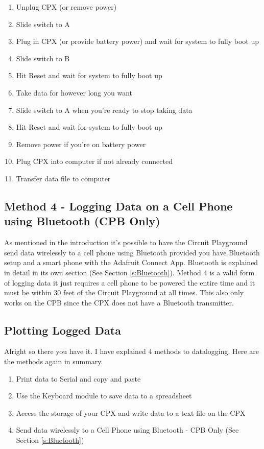 \begin{enumerate}[itemsep=-5pt]
\item Unplug CPX (or remove power)
\item Slide switch to A
\item Plug in CPX (or provide battery power) and wait for system to fully boot up
\item Slide switch to B
\item Hit Reset and wait for system to fully boot up
\item Take data for however long you want
\item Slide switch to A when you're ready to stop taking data
\item Hit Reset and wait for system to fully boot up
\item Remove power if you’re on battery power
\item Plug CPX into computer if not already connected
\item Transfer data file to computer
\end{enumerate}

\subsection{Method 4 - Logging Data on a Cell Phone using Bluetooth
(CPB Only)}

As mentioned in the introduction it's possible to have the Circuit
Playground send data wirelessly to a cell phone using Bluetooth
provided you have Bluetooth setup and a smart phone with the Adafruit
Connect App. Bluetooth is explained in detail in its own section (See
Section \ref{s:Bluetooth}). Method 4 is a valid form of logging data
it just requires a cell phone to be powered the entire time and it
must be within 30 feet of the Circuit Playground at all times. This
also only works on the CPB since the CPX does not have a Bluetooth
transmitter. 

\subsection{Plotting Logged Data}

Alright so there you have it. I have explained 4 methods to
datalogging. Here are the methods again in summary.

\begin{enumerate}[itemsep=-5pt]
\item Print data to Serial and copy and paste
\item Use the Keyboard module to save data to a spreadsheet
\item Access the storage of your CPX and write data to a text file on
the CPX
\item Send data wirelessly to a Cell Phone using Bluetooth - CPB Only (See
Section \ref{s:Bluetooth})
\end{enumerate}

